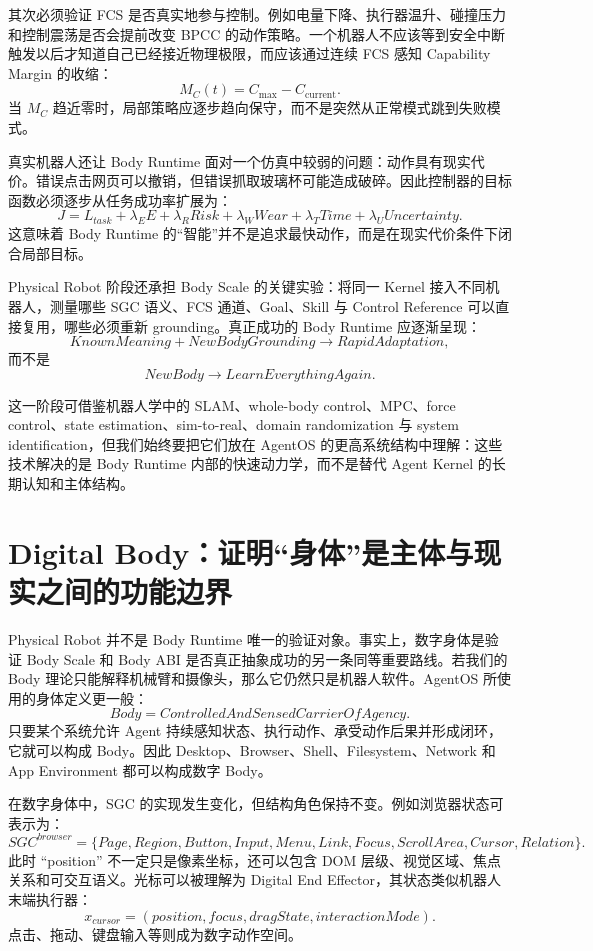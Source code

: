 其次必须验证 FCS 是否真实地参与控制。例如电量下降、执行器温升、碰撞压力和控制震荡是否会提前改变 BPCC 的动作策略。一个机器人不应该等到安全中断触发以后才知道自己已经接近物理极限，而应该通过连续 FCS 感知 Capability Margin 的收缩：
\[
M_C(t)
=
C_{\max}
-
C_{\mathrm{current}}.
\]
当 $M_C$ 趋近零时，局部策略应逐步趋向保守，而不是突然从正常模式跳到失败模式。

真实机器人还让 Body Runtime 面对一个仿真中较弱的问题：动作具有现实代价。错误点击网页可以撤销，但错误抓取玻璃杯可能造成破碎。因此控制器的目标函数必须逐步从任务成功率扩展为：
\[
J
=
L_{task}
+
\lambda_EE
+
\lambda_RRisk
+
\lambda_WWear
+
\lambda_TTime
+
\lambda_UUncertainty.
\]
这意味着 Body Runtime 的“智能”并不是追求最快动作，而是在现实代价条件下闭合局部目标。

Physical Robot 阶段还承担 Body Scale 的关键实验：将同一 Kernel 接入不同机器人，测量哪些 SGC 语义、FCS 通道、Goal、Skill 与 Control Reference 可以直接复用，哪些必须重新 grounding。真正成功的 Body Runtime 应逐渐呈现：
\[
KnownMeaning
+
NewBodyGrounding
\rightarrow
RapidAdaptation,
\]
而不是
\[
NewBody\rightarrow LearnEverythingAgain.
\]

这一阶段可借鉴机器人学中的 SLAM、whole-body control、MPC、force control、state estimation、sim-to-real、domain randomization 与 system identification，但我们始终要把它们放在 AgentOS 的更高系统结构中理解：这些技术解决的是 Body Runtime 内部的快速动力学，而不是替代 Agent Kernel 的长期认知和主体结构。

\section{Digital Body：证明“身体”是主体与现实之间的功能边界}

Physical Robot 并不是 Body Runtime 唯一的验证对象。事实上，数字身体是验证 Body Scale 和 Body ABI 是否真正抽象成功的另一条同等重要路线。若我们的 Body 理论只能解释机械臂和摄像头，那么它仍然只是机器人软件。AgentOS 所使用的身体定义更一般：
\[
\boxed{
Body=
ControlledAndSensedCarrierOfAgency.
}
\]
只要某个系统允许 Agent 持续感知状态、执行动作、承受动作后果并形成闭环，它就可以构成 Body。因此 Desktop、Browser、Shell、Filesystem、Network 和 App Environment 都可以构成数字 Body。

在数字身体中，SGC 的实现发生变化，但结构角色保持不变。例如浏览器状态可表示为：
\[
SGC^{browser}
=
\{
Page,
Region,
Button,
Input,
Menu,
Link,
Focus,
ScrollArea,
Cursor,
Relation
\}.
\]
此时 ``position'' 不一定只是像素坐标，还可以包含 DOM 层级、视觉区域、焦点关系和可交互语义。光标可以被理解为 Digital End Effector，其状态类似机器人末端执行器：
\[
x_{cursor}
=
(position,focus,dragState,interactionMode).
\]
点击、拖动、键盘输入等则成为数字动作空间。

